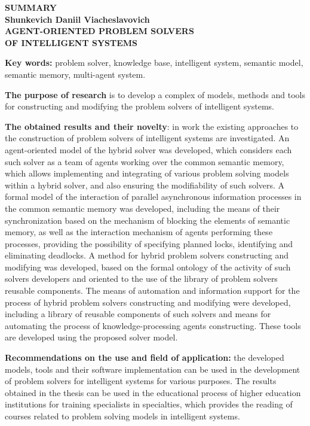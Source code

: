 \documentclass{thesisby}
\begin{document}
\newpage
\begin{center}
\bf SUMMARY\\[1mm]\rm Shunkevich Daniil Viacheslavovich\\[1mm] \bf
AGENT-ORIENTED PROBLEM SOLVERS \\OF INTELLIGENT SYSTEMS
\end{center}

{\bf Key words:} problem solver, knowledge base, intelligent system, semantic model, semantic memory, multi-agent system.

\textbf{The purpose of research } is to develop a complex of models, methods and tools for constructing and modifying the problem solvers of intelligent systems.

\textbf{The obtained results and their novelty}:
in work the existing approaches to the construction of problem solvers of intelligent systems are investigated. An agent-oriented model of the hybrid solver was developed, which considers each such solver as a team of agents working over the common semantic memory, which allows implementing and integrating of various problem solving models within a hybrid solver, and also ensuring the modifiability of such solvers. A formal model of the interaction of parallel asynchronous information processes in the common semantic memory was developed, including the means of their synchronization based on the mechanism of blocking the elements of semantic memory, as well as the interaction mechanism of agents performing these processes, providing the possibility of specifying planned locks, identifying and eliminating deadlocks. A method for hybrid problem solvers constructing and modifying was developed, based on the formal ontology of the activity of such solvers developers and oriented to the use of the library of problem solvers reusable components. The means of automation and information support for the process of hybrid problem solvers constructing and modifying were developed, including a library of reusable components of such solvers and means for automating the process of knowledge-processing agents constructing. These tools are developed using the proposed solver model.

\textbf{Recommendations on the use and field of application:}
the developed models, tools and their software implementation can be used in the development of problem solvers for intelligent systems for various purposes. The results obtained in the thesis can be used in the educational process of higher education institutions for training specialists in specialties, which provides the reading of courses related to problem solving models in intelligent systems.
\end{document}
